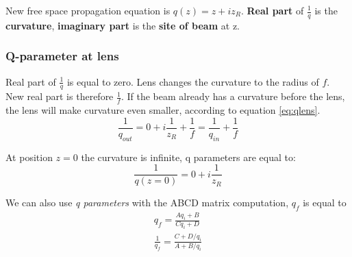 New free space propagation equation is $q(z) = z + i z_R$. \textbf{Real part} of $\frac{1}{q}$ is the \textbf{curvature}, \textbf{imaginary part} is the \textbf{site of beam} at z.

\subsubsection{Q-parameter at lens}
Real part of $\frac{1}{q}$ is equal to zero. Lens changes the curvature to the radius of $f$. New real 
part is therefore $\frac{1}{f}$. If the beam already has a curvature before the lens, 
the lens will make curvature even smaller, according to equation \ref{eq:qlens}.
\begin{equation}
    \frac{1}{q_{out}} = 0 + i \frac{1}{z_R} + \frac{1}{f} = \frac{1}{q_{in}} + \frac{1}{f}
    \label{eq:qlens}
\end{equation}

At position $z=0$ the curvature is infinite, q parameters are equal to:
\begin{equation}
    \frac{1}{q(z=0)} = 0 + i \frac{1}{z_R}
\end{equation}

We can also use \textit{q parameters} with the ABCD matrix computation, $q_f$ is equal to
\begin{gather}
    q_f = \frac{A q_i + B}{C q_i + D} \\
    \frac{1}{q_f} = \frac{C + D/q_i}{A + B/q_i}
\end{gather}
